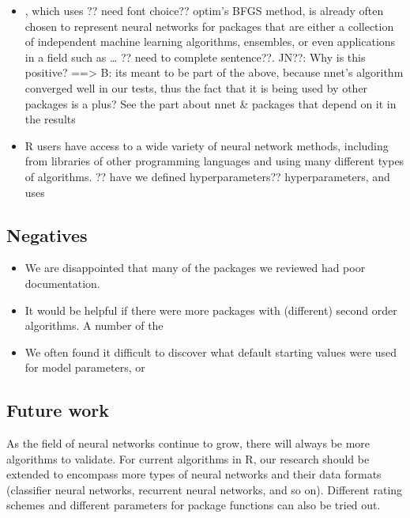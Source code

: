 \begin{itemize}
\tightlist
\item
  , which uses ?? need font choice?? optim's BFGS method, is
  already often chosen to represent neural networks for packages that
  are either a collection of independent machine learning algorithms,
  ensembles, or even applications in a field such as \ldots{} ?? need to
  complete sentence??. JN??: Why is this positive? ==\textgreater{} B:
  its meant to be part of the above, because nnet's algorithm converged
  well in our tests, thus the fact that it is being used by other
  packages is a plus? See the part about nnet \& packages that depend on
  it in the results
\item
  R users have access to a wide variety of neural network methods,
  including from libraries of other programming languages and using many
  different types of algorithms. ?? have we defined hyperparameters??
  hyperparameters, and uses 
\end{itemize}

\hypertarget{negatives}{%
\subsection{Negatives}\label{negatives}}

\begin{itemize}
\tightlist
\item
  We are disappointed that many of the packages we reviewed had poor
  documentation.
\item
  It would be helpful if there were more packages with (different)
  second order algorithms. A number of the 
\item
  We often found it difficult to discover what default starting values
  were used for model parameters, or 
\end{itemize}

\hypertarget{future-work}{%
\subsection{Future work}\label{future-work}}

As the field of neural networks continue to grow, there will always be
more algorithms to validate. For current algorithms in R, our research
should be extended to encompass more types of neural networks and their
data formats (classifier neural networks, recurrent neural networks, and
so on). Different rating schemes and different parameters for package
functions can also be tried out.

